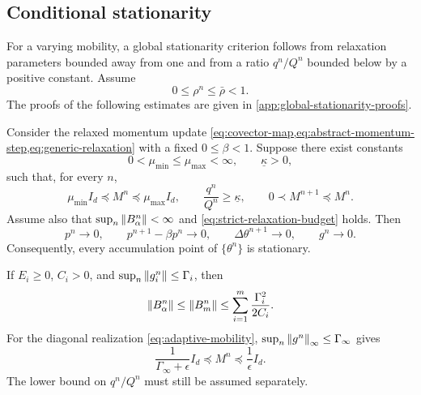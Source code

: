 \subsection{Conditional stationarity}
\label{sec:conditional-stationarity}

For a varying mobility, a global stationarity criterion follows from
relaxation parameters bounded away from one and from a ratio \(q^n/Q^n\)
bounded below by a positive constant. Assume
\begin{equation}
  0\leq\rho^n\leq\bar\rho<1.
  \label{eq:strict-relaxation-budget}
\end{equation}
The proofs of the following estimates are given in
\cref{app:global-stationarity-proofs}.

\begin{theorem}
\label{thm:conditional-stationarity}
Consider the relaxed momentum update
\cref{eq:covector-map,eq:abstract-momentum-step,eq:generic-relaxation} with a
fixed \(0\leq\beta<1\).  Suppose there exist constants
\begin{equation}
  0<\mu_{\min}\leq\mu_{\max}<\infty,
  \qquad \underline\kappa>0,
  \label{eq:stationarity-constants}
\end{equation}
such that, for every \(n\),
\begin{equation}
  \mu_{\min}I_d\preceq M^n\preceq\mu_{\max}I_d,
  \qquad
  \frac{q^n}{Q^n}\geq\underline\kappa,
  \qquad
  0\prec M^{n+1}\preceq M^n.
  \label{eq:stationarity-assumptions}
\end{equation}
Assume also that \(\sup_n\left\lVert B_\alpha^n\right\rVert<\infty\) and
\cref{eq:strict-relaxation-budget} holds.  Then
\begin{equation}
  p^n\to0,
  \qquad
  p^{n+1}-\beta p^n\to0,
  \qquad
  \Delta\theta^{n+1}\to0,
  \qquad
  g^n\to0.
  \label{eq:stationarity-limits}
\end{equation}
Consequently, every accumulation point of \(\{\theta^n\}\) is stationary.
\end{theorem}


\begin{remark}
If \(E_i\geq0\), \(C_i>0\), and
\(\sup_n\left\lVert g_i^n\right\rVert\leq\Gamma_i\), then
\begin{equation}
  \left\lVert B_\alpha^n\right\rVert
  \leq \left\lVert B_m^n\right\rVert
  \leq \sum_{i=1}^m\frac{\Gamma_i^2}{2C_i}.
  \label{eq:bounded-pullback-condition}
\end{equation}
For the diagonal realization \cref{eq:adaptive-mobility},
\(\sup_n\left\lVert g^n\right\rVert_\infty\leq\Gamma_\infty\) gives
\begin{equation}
  \frac{1}{\Gamma_\infty+\epsilon}I_d\preceq M^n\preceq\frac1\epsilon I_d.
  \label{eq:bounded-mobility-condition}
\end{equation}
The lower bound on \(q^n/Q^n\) must still be assumed separately.
\end{remark}

